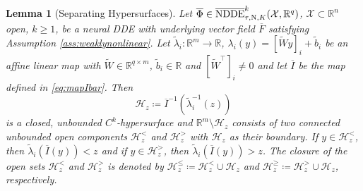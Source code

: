 \documentclass[10pt]{article}
\numberwithin{equation}{section}
\newtheorem{lemma}[theorem]{Lemma}
\begin{document}
	\begin{lemma}[Separating Hypersurfaces] \label{lem:hypersurface}
		Let  $\overline{\Phi}\in\overline{\textup{NDDE}}^k_{\tau,\textup{N},K}(\mathcal{X},\mathbb{R}^q)$, $\mathcal{X}\subset \mathbb{R}^n$ open, $k \geq 1$, be a neural DDE with underlying vector field $\overline{F}$ satisfying Assumption \ref{ass:weaklynonlinear}. Let  $\tilde \lambda_i: \mathbb{R}^m \rightarrow \mathbb{R}$, $\lambda_i(y) = [\widetilde{W}y]_i + \tilde  b_i$ be an affine linear map with  $\widetilde{W}\in\mathbb{R}^{q \times m}$, $\tilde b_i \in \mathbb{R}$ and $[\widetilde{W}^\top]_i \neq 0$ and let $\overline{I}$ be the map defined in \eqref{eq:mapIbar}. Then
		\begin{equation*}
			\mathcal{H}_z \coloneqq \overline{I}^{-1}(\tilde{\lambda}_i^{-1}(z))
		\end{equation*}
		is a closed, unbounded $C^k$-hypersurface and $\mathbb{R}^m\setminus \mathcal{H}_z$ consists of two connected unbounded open components $\mathcal{H}_z^{<}$ and $\mathcal{H}_z^{>}$ with $\mathcal{H}_z$ as their boundary. If $y\in \mathcal{H}_z^{<}$, then $\tilde{\lambda}_i(\overline{I}(y))<z$ and if $y\in \mathcal{H}_z^{>}$, then $\tilde{\lambda}_i(\overline{I}(y))>z$. The closure of the open sets $\mathcal{H}_z^{<}$ and $\mathcal{H}_z^{>}$ is denoted by $\mathcal{H}_z^{\leq} \coloneqq  \mathcal{H}_z^{<} \cup \mathcal{H}_z $ and $\mathcal{H}_z^{\geq}\coloneqq  \mathcal{H}_z^{>} \cup \mathcal{H}_z $, respectively.
	\end{lemma}
	
\end{document}
